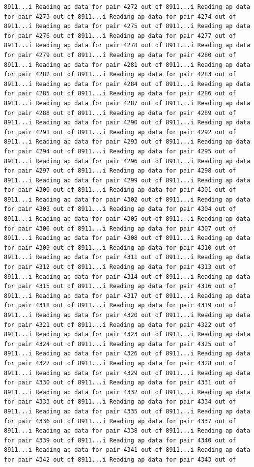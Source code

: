 \documentclass[
]{article}
\begin{document}
\begin{verbatim}
8911...i Reading ap data for pair 4272 out of 8911...i Reading ap data for pair 4273 out of 8911...i Reading ap data for pair 4274 out of 8911...i Reading ap data for pair 4275 out of 8911...i Reading ap data for pair 4276 out of 8911...i Reading ap data for pair 4277 out of 8911...i Reading ap data for pair 4278 out of 8911...i Reading ap data for pair 4279 out of 8911...i Reading ap data for pair 4280 out of 8911...i Reading ap data for pair 4281 out of 8911...i Reading ap data for pair 4282 out of 8911...i Reading ap data for pair 4283 out of 8911...i Reading ap data for pair 4284 out of 8911...i Reading ap data for pair 4285 out of 8911...i Reading ap data for pair 4286 out of 8911...i Reading ap data for pair 4287 out of 8911...i Reading ap data for pair 4288 out of 8911...i Reading ap data for pair 4289 out of 8911...i Reading ap data for pair 4290 out of 8911...i Reading ap data for pair 4291 out of 8911...i Reading ap data for pair 4292 out of 8911...i Reading ap data for pair 4293 out of 8911...i Reading ap data for pair 4294 out of 8911...i Reading ap data for pair 4295 out of 8911...i Reading ap data for pair 4296 out of 8911...i Reading ap data for pair 4297 out of 8911...i Reading ap data for pair 4298 out of 8911...i Reading ap data for pair 4299 out of 8911...i Reading ap data for pair 4300 out of 8911...i Reading ap data for pair 4301 out of 8911...i Reading ap data for pair 4302 out of 8911...i Reading ap data for pair 4303 out of 8911...i Reading ap data for pair 4304 out of 8911...i Reading ap data for pair 4305 out of 8911...i Reading ap data for pair 4306 out of 8911...i Reading ap data for pair 4307 out of 8911...i Reading ap data for pair 4308 out of 8911...i Reading ap data for pair 4309 out of 8911...i Reading ap data for pair 4310 out of 8911...i Reading ap data for pair 4311 out of 8911...i Reading ap data for pair 4312 out of 8911...i Reading ap data for pair 4313 out of 8911...i Reading ap data for pair 4314 out of 8911...i Reading ap data for pair 4315 out of 8911...i Reading ap data for pair 4316 out of 8911...i Reading ap data for pair 4317 out of 8911...i Reading ap data for pair 4318 out of 8911...i Reading ap data for pair 4319 out of 8911...i Reading ap data for pair 4320 out of 8911...i Reading ap data for pair 4321 out of 8911...i Reading ap data for pair 4322 out of 8911...i Reading ap data for pair 4323 out of 8911...i Reading ap data for pair 4324 out of 8911...i Reading ap data for pair 4325 out of 8911...i Reading ap data for pair 4326 out of 8911...i Reading ap data for pair 4327 out of 8911...i Reading ap data for pair 4328 out of 8911...i Reading ap data for pair 4329 out of 8911...i Reading ap data for pair 4330 out of 8911...i Reading ap data for pair 4331 out of 8911...i Reading ap data for pair 4332 out of 8911...i Reading ap data for pair 4333 out of 8911...i Reading ap data for pair 4334 out of 8911...i Reading ap data for pair 4335 out of 8911...i Reading ap data for pair 4336 out of 8911...i Reading ap data for pair 4337 out of 8911...i Reading ap data for pair 4338 out of 8911...i Reading ap data for pair 4339 out of 8911...i Reading ap data for pair 4340 out of 8911...i Reading ap data for pair 4341 out of 8911...i Reading ap data for pair 4342 out of 8911...i Reading ap data for pair 4343 out of 
\end{verbatim}
\end{document}
